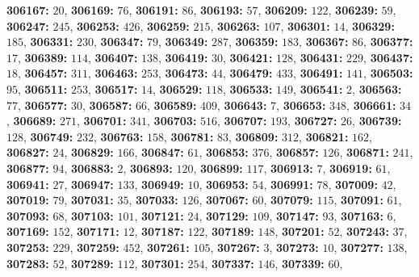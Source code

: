 \textsf{\bfseries 306167:} $20$, \textsf{\bfseries 306169:} $76$, \textsf{\bfseries 306191:} $86$, \textsf{\bfseries 306193:} $57$, \textsf{\bfseries 306209:} $122$, \textsf{\bfseries 306239:} $59$, \textsf{\bfseries 306247:} $245$, \textsf{\bfseries 306253:} $426$, \textsf{\bfseries 306259:} $215$, \textsf{\bfseries 306263:} $107$, \textsf{\bfseries 306301:} $14$, \textsf{\bfseries 306329:} $185$, \textsf{\bfseries 306331:} $230$, \textsf{\bfseries 306347:} $79$, \textsf{\bfseries 306349:} $287$, \textsf{\bfseries 306359:} $183$, \textsf{\bfseries 306367:} $86$, \textsf{\bfseries 306377:} $17$, \textsf{\bfseries 306389:} $114$, \textsf{\bfseries 306407:} $138$, \textsf{\bfseries 306419:} $30$, \textsf{\bfseries 306421:} $128$, \textsf{\bfseries 306431:} $229$, \textsf{\bfseries 306437:} $18$, \textsf{\bfseries 306457:} $311$, \textsf{\bfseries 306463:} $253$, \textsf{\bfseries 306473:} $44$, \textsf{\bfseries 306479:} $433$, \textsf{\bfseries 306491:} $141$, \textsf{\bfseries 306503:} $95$, \textsf{\bfseries 306511:} $253$, \textsf{\bfseries 306517:} $14$, \textsf{\bfseries 306529:} $118$, \textsf{\bfseries 306533:} $149$, \textsf{\bfseries 306541:} $2$, \textsf{\bfseries 306563:} $77$, \textsf{\bfseries 306577:} $30$, \textsf{\bfseries 306587:} $66$, \textsf{\bfseries 306589:} $409$, \textsf{\bfseries 306643:} $7$, \textsf{\bfseries 306653:} $348$, \textsf{\bfseries 306661:} $34$, \textsf{\bfseries 306689:} $271$, \textsf{\bfseries 306701:} $341$, \textsf{\bfseries 306703:} $516$, \textsf{\bfseries 306707:} $193$, \textsf{\bfseries 306727:} $26$, \textsf{\bfseries 306739:} $128$, \textsf{\bfseries 306749:} $232$, \textsf{\bfseries 306763:} $158$, \textsf{\bfseries 306781:} $83$, \textsf{\bfseries 306809:} $312$, \textsf{\bfseries 306821:} $162$, \textsf{\bfseries 306827:} $24$, \textsf{\bfseries 306829:} $166$, \textsf{\bfseries 306847:} $61$, \textsf{\bfseries 306853:} $376$, \textsf{\bfseries 306857:} $126$, \textsf{\bfseries 306871:} $241$, \textsf{\bfseries 306877:} $94$, \textsf{\bfseries 306883:} $2$, \textsf{\bfseries 306893:} $120$, \textsf{\bfseries 306899:} $117$, \textsf{\bfseries 306913:} $7$, \textsf{\bfseries 306919:} $61$, \textsf{\bfseries 306941:} $27$, \textsf{\bfseries 306947:} $133$, \textsf{\bfseries 306949:} $10$, \textsf{\bfseries 306953:} $54$, \textsf{\bfseries 306991:} $78$, \textsf{\bfseries 307009:} $42$, \textsf{\bfseries 307019:} $79$, \textsf{\bfseries 307031:} $35$, \textsf{\bfseries 307033:} $126$, \textsf{\bfseries 307067:} $60$, \textsf{\bfseries 307079:} $115$, \textsf{\bfseries 307091:} $61$, \textsf{\bfseries 307093:} $68$, \textsf{\bfseries 307103:} $101$, \textsf{\bfseries 307121:} $24$, \textsf{\bfseries 307129:} $109$, \textsf{\bfseries 307147:} $93$, \textsf{\bfseries 307163:} $6$, \textsf{\bfseries 307169:} $152$, \textsf{\bfseries 307171:} $12$, \textsf{\bfseries 307187:} $122$, \textsf{\bfseries 307189:} $148$, \textsf{\bfseries 307201:} $52$, \textsf{\bfseries 307243:} $37$, \textsf{\bfseries 307253:} $229$, \textsf{\bfseries 307259:} $452$, \textsf{\bfseries 307261:} $105$, \textsf{\bfseries 307267:} $3$, \textsf{\bfseries 307273:} $10$, \textsf{\bfseries 307277:} $138$, \textsf{\bfseries 307283:} $52$, \textsf{\bfseries 307289:} $112$, \textsf{\bfseries 307301:} $254$, \textsf{\bfseries 307337:} $146$, \textsf{\bfseries 307339:} $60$, 

